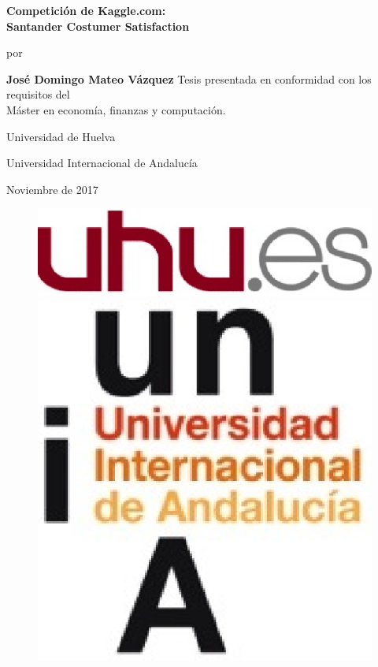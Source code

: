 \documentclass[11pt,a4paper,spanish]{article} %
\begin{document}
\nocite{*}

\begin{titlepage}
    \begin{center}
        \vspace*{6cm}
        \Huge
        \textbf{Competición de Kaggle.com: \\
        Santander Costumer Satisfaction}
        \vspace{1cm}
        
        \LARGE
        por
        
        \vspace{1cm}
        \textbf{José Domingo Mateo Vázquez}
        \vfill
        \normalsize
        Tesis presentada en conformidad con los requisitos del \\
		 Máster en economía, finanzas y computación.


        \Large
        
        
        \vspace{1cm}
        
        Universidad de Huelva  
        
        Universidad Internacional de Andalucía  
        
        Noviembre de 2017
          
        \begin{figure}[b]
			\begin{multicols}{2}
   				 \includegraphics[scale=0.3]{logouhu.eps}\par 
   				 \hfill
    			 \includegraphics[scale=0.4]{logounia.eps}\par 
    		\end{multicols}
		\end{figure}
	

\end{center}
\end{titlepage}
\end{document}
